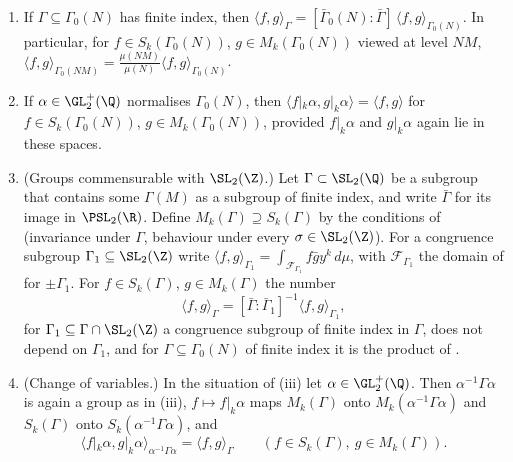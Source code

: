 \begin{proposition}\label{prop:modforms:petersson-change}
\begin{enumerate}[label=(\roman*)]
\item If $\Gamma\subseteq\Gamma_0(N)$ has finite index, then $\langle f,g\rangle_\Gamma=[\bar\Gamma_0(N):\bar\Gamma]\,\langle f,g\rangle_{\Gamma_0(N)}$. In particular, for $f\in S_k(\Gamma_0(N))$, $g\in M_k(\Gamma_0(N))$
viewed at level $NM$, $\langle f,g\rangle_{\Gamma_0(NM)}=\frac{\mu(NM)}{\mu(N)}\langle f,g\rangle_{\Gamma_0(N)}$.
\item If $\alpha\in\GL_2^+(\Q)$ normalises $\Gamma_0(N)$, then $\langle f|_k\alpha,g|_k\alpha\rangle=\langle f,g\rangle$ for $f\in S_k(\Gamma_0(N))$, $g\in M_k(\Gamma_0(N))$, provided $f|_k\alpha$ and $g|_k\alpha$
again lie in these spaces.
\item (Groups commensurable with $\SL_2(\Z)$.) Let $\Gamma\subset\SL_2(\Q)$ be a subgroup that contains some $\Gamma(M)$ as a subgroup of finite index, and write $\bar\Gamma$ for its image in
$\PSL_2(\R)$. Define $M_k(\Gamma)\supseteq S_k(\Gamma)$ by the conditions of  (invariance under $\Gamma$, behaviour under every $\sigma\in\SL_2(\Z)$). For a congruence
subgroup $\Gamma_1\subseteq\SL_2(\Z)$ write $\langle f,g\rangle_{\Gamma_1}=\int_{\mathcal F_{\Gamma_1}}f\bar gy^k\,d\mu$, with $\mathcal F_{\Gamma_1}$ the domain of  for
$\pm\Gamma_1$. For $f\in S_k(\Gamma)$, $g\in M_k(\Gamma)$ the number
\[
\langle f,g\rangle_\Gamma=[\bar\Gamma:\bar\Gamma_1]^{-1}\langle f,g\rangle_{\Gamma_1},
\]
for $\Gamma_1\subseteq\Gamma\cap\SL_2(\Z)$ a congruence subgroup of finite index in $\Gamma$, does not depend on $\Gamma_1$, and for $\Gamma\subseteq\Gamma_0(N)$ of finite index it is the product of .
\item (Change of variables.) In the situation of (iii) let $\alpha\in\GL_2^+(\Q)$. Then $\alpha^{-1}\Gamma\alpha$ is again a group as in (iii), $f\mapsto f|_k\alpha$ maps $M_k(\Gamma)$ onto
$M_k(\alpha^{-1}\Gamma\alpha)$ and $S_k(\Gamma)$ onto $S_k(\alpha^{-1}\Gamma\alpha)$, and
\[
\langle f|_k\alpha,g|_k\alpha\rangle_{\alpha^{-1}\Gamma\alpha}=\langle f,g\rangle_\Gamma\qquad(f\in S_k(\Gamma),\ g\in M_k(\Gamma)).
\]
\end{enumerate}
\end{proposition}

